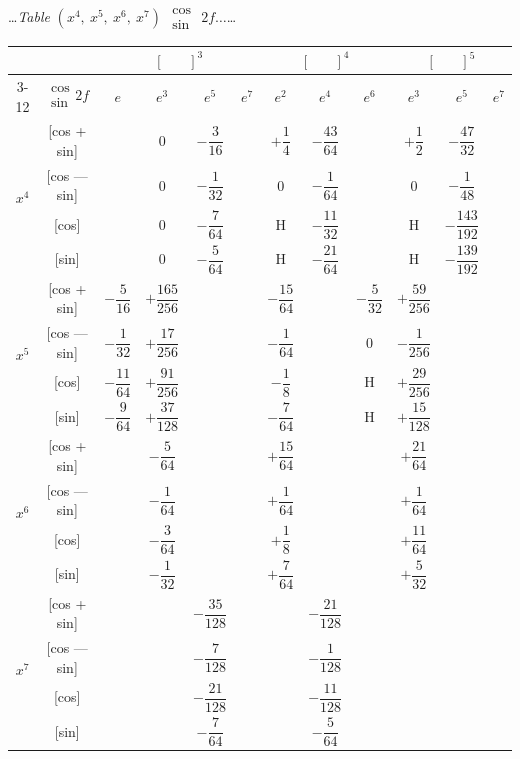 \documentclass[10pt,a4paper]{article}
\newcommand{\tabletitle}[2]{%
  \begin{center}
  \ldots\textit{Table} #1 $\displaystyle\begin{smallmatrix} \cos \\ \sin \end{smallmatrix}$ #2\ldots
  \end{center}
}
\begin{document}
\newpage

\tabletitle{$(x^4,\ x^5,\ x^6,\ x^7)$}{$2f\ldots$}

\begin{center}
\small
\begin{tabular}{|c|c|c|c|c|c|c|c|c|c|c|c|}
\hline
& & \multicolumn{4}{c|}{$[\phantom{()}]^3$} & \multicolumn{3}{c|}{$[\phantom{()}]^4$} & \multicolumn{3}{c|}{$[\phantom{()}]^5$} \\
\cline{3-12}
& $\begin{smallmatrix} \cos \\ \sin \end{smallmatrix} 2f$ & $e$ & $e^3$ & $e^5$ & $e^7$ & $e^2$ & $e^4$ & $e^6$ & $e^3$ & $e^5$ & $e^7$ \\
\hline
\multirow{4}{*}{$x^4$} & [cos + sin] & & $0$ & $-\dfrac{3}{16}$ & & $+\dfrac{1}{4}$ & $-\dfrac{43}{64}$ & & $+\dfrac{1}{2}$ & $-\dfrac{47}{32}$ \\
& [cos --- sin] & & $0$ & $-\dfrac{1}{32}$ & & $0$ & $-\dfrac{1}{64}$ & & $0$ & $-\dfrac{1}{48}$ \\
& [cos] & & $0$ & $-\dfrac{7}{64}$ & & H & $-\dfrac{11}{32}$ & & H & $-\dfrac{143}{192}$ \\
& [sin] & & $0$ & $-\dfrac{5}{64}$ & & H & $-\dfrac{21}{64}$ & & H & $-\dfrac{139}{192}$ \\
\hline
\multirow{4}{*}{$x^5$} & [cos + sin] & $-\dfrac{5}{16}$ & $+\dfrac{165}{256}$ & & & $-\dfrac{15}{64}$ & & $-\dfrac{5}{32}$ & $+\dfrac{59}{256}$ \\
& [cos --- sin] & $-\dfrac{1}{32}$ & $+\dfrac{17}{256}$ & & & $-\dfrac{1}{64}$ & & $0$ & $-\dfrac{1}{256}$ \\
& [cos] & $-\dfrac{11}{64}$ & $+\dfrac{91}{256}$ & & & $-\dfrac{1}{8}$ & & H & $+\dfrac{29}{256}$ \\
& [sin] & $-\dfrac{9}{64}$ & $+\dfrac{37}{128}$ & & & $-\dfrac{7}{64}$ & & H & $+\dfrac{15}{128}$ \\
\hline
\multirow{4}{*}{$x^6$} & [cos + sin] & & $-\dfrac{5}{64}$ & & & $+\dfrac{15}{64}$ & & & $+\dfrac{21}{64}$ \\
& [cos --- sin] & & $-\dfrac{1}{64}$ & & & $+\dfrac{1}{64}$ & & & $+\dfrac{1}{64}$ \\
& [cos] & & $-\dfrac{3}{64}$ & & & $+\dfrac{1}{8}$ & & & $+\dfrac{11}{64}$ \\
& [sin] & & $-\dfrac{1}{32}$ & & & $+\dfrac{7}{64}$ & & & $+\dfrac{5}{32}$ \\
\hline
\multirow{4}{*}{$x^7$} & [cos + sin] & & & $-\dfrac{35}{128}$ & & & $-\dfrac{21}{128}$ \\
& [cos --- sin] & & & $-\dfrac{7}{128}$ & & & $-\dfrac{1}{128}$ \\
& [cos] & & & $-\dfrac{21}{128}$ & & & $-\dfrac{11}{128}$ \\
& [sin] & & & $-\dfrac{7}{64}$ & & & $-\dfrac{5}{64}$ \\
\hline
\end{tabular}
\end{center}
\end{document}
